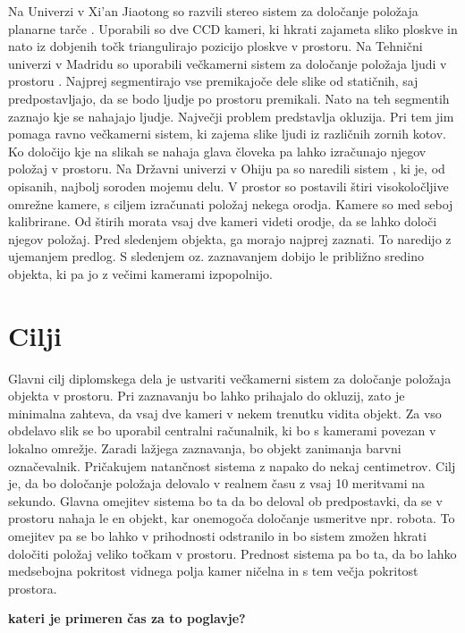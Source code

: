 \documentclass[a4paper, 12pt]{book}
\begin{document}
Na Univerzi v Xi’an Jiaotong so razvili stereo sistem za določanje položaja planarne tarče \cite{li2008development}. Uporabili so dve CCD \cite{wiki:ccd} kameri, ki hkrati zajameta sliko ploskve in nato iz dobjenih točk triangulirajo pozicijo ploskve v prostoru. Na Tehnični univerzi v Madridu so uporabili večkamerni sistem za določanje položaja ljudi v prostoru \cite{mohedano2008robust}. Najprej segmentirajo vse premikajoče dele slike od statičnih, saj predpostavljajo, da se bodo ljudje po prostoru premikali. Nato na teh segmentih zaznajo kje se nahajajo ljudje. Največji problem predstavlja okluzija. Pri tem jim pomaga ravno večkamerni sistem, ki zajema slike ljudi iz različnih zornih kotov. Ko določijo kje na slikah se nahaja glava človeka pa lahko izračunajo njegov položaj v prostoru. Na Državni univerzi v Ohiju pa so naredili sistem \cite{lee2013real}, ki je, od opisanih, najbolj soroden mojemu delu. V prostor so postavili štiri visokoločljive omrežne kamere, s ciljem izračunati položaj nekega orodja. Kamere so med seboj kalibrirane. Od štirih morata vsaj dve kameri videti orodje, da se lahko določi njegov položaj. Pred sledenjem objekta, ga morajo najprej zaznati. To naredijo z ujemanjem predlog. S sledenjem oz. zaznavanjem dobijo le približno sredino objekta, ki pa jo z večimi kamerami izpopolnijo.

\section{Cilji}
Glavni cilj diplomskega dela je ustvariti večkamerni sistem za določanje položaja objekta v prostoru. Pri zaznavanju bo lahko prihajalo do okluzij, zato je minimalna zahteva, da vsaj dve kameri v nekem trenutku vidita objekt. Za vso obdelavo slik se bo uporabil centralni računalnik, ki bo s kamerami povezan v lokalno omrežje. Zaradi lažjega zaznavanja, bo objekt zanimanja barvni označevalnik. Pričakujem natančnost sistema z napako do nekaj centimetrov. Cilj je, da bo določanje položaja delovalo v realnem času z vsaj 10 meritvami na sekundo. Glavna omejitev sistema bo ta da bo deloval ob predpostavki, da se v prostoru nahaja le en objekt, kar onemogoča določanje usmeritve npr. robota. To omejitev pa se bo lahko v prihodnosti odstranilo in bo sistem zmožen hkrati določiti položaj veliko točkam v prostoru. Prednost sistema pa bo ta, da bo lahko medsebojna pokritost vidnega polja kamer ničelna in s tem večja pokritost prostora.

\textbf{kateri je primeren čas za to poglavje?}
\end{document}
